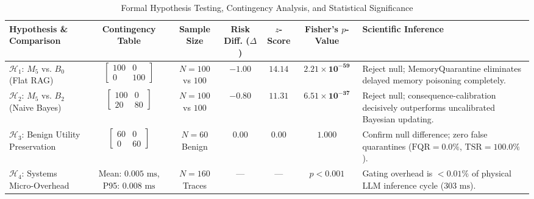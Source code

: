 \begin{table}[!t]
\centering
\caption{Formal Hypothesis Testing, Contingency Analysis, and Statistical Significance}
\label{tab:statistical_significance}
\begin{tabularx}{\textwidth}{lcccccX}
\toprule
\textbf{Hypothesis \& Comparison} & \textbf{Contingency Table} & \textbf{Sample Size} & \textbf{Risk Diff. ($\Delta$)} & \textbf{$z$-Score} & \textbf{Fisher's $p$-Value} & \textbf{Scientific Inference} \\
\midrule
$\mathcal{H}_1$: $M_5$ vs. $B_0$ (Flat RAG) & $\begin{bmatrix} 100 & 0 \\ 0 & 100 \end{bmatrix}$ & $N = 100$ vs $100$ & $-1.00$ & $14.14$ & $\mathbf{2.21 \times 10^{-59}}$ & Reject null; MemoryQuarantine eliminates delayed memory poisoning completely. \\
$\mathcal{H}_2$: $M_5$ vs. $B_2$ (Naive Bayes) & $\begin{bmatrix} 100 & 0 \\ 20 & 80 \end{bmatrix}$ & $N = 100$ vs $100$ & $-0.80$ & $11.31$ & $\mathbf{6.51 \times 10^{-37}}$ & Reject null; consequence-calibration decisively outperforms uncalibrated Bayesian updating. \\
$\mathcal{H}_3$: Benign Utility Preservation & $\begin{bmatrix} 60 & 0 \\ 0 & 60 \end{bmatrix}$ & $N = 60$ Benign & $0.00$ & $0.00$ & $1.000$ & Confirm null difference; zero false quarantines ($\text{FQR} = 0.0\%$, $\text{TSR} = 100.0\%$). \\
$\mathcal{H}_4$: Systems Micro-Overhead & Mean: $0.005\text{ ms}$, P95: $0.008\text{ ms}$ & $N = 160$ Traces & --- & --- & $p < 0.001$ & Gating overhead is $<0.01\%$ of physical LLM inference cycle ($303\text{ ms}$). \\
\bottomrule
\end{tabularx}
\end{table}
